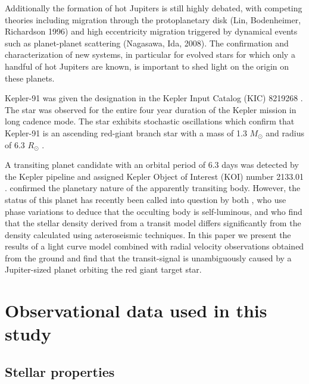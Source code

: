 \documentclass[apjl]{emulateapj}
\begin{document}
Additionally the formation of hot Jupiters is still highly debated, with competing theories including migration through the protoplanetary disk (Lin, Bodenheimer, Richardson 1996) and high eccentricity migration triggered by dynamical events such as planet-planet scattering (Nagasawa, Ida, 2008). The confirmation and characterization of new systems, in particular for evolved stars for which only a handful of hot Jupiters are known, is important to shed light on the origin on these planets.

Kepler-91 was given the designation in the Kepler Input Catalog (KIC) 8219268 \citep{brown11}. The star was observed for the entire four year duration of the Kepler mission in long cadence mode. The star exhibits stochastic oscillations which confirm that Kepler-91 is an ascending red-giant branch star with a mass of 1.3 $M_\odot$ and radius of 6.3 $R_\odot$ \citep{huber13,lillo14}.



A transiting planet candidate with an orbital period of 6.3 days was detected by the Kepler pipeline \citep{jenkins10} and assigned Kepler Object of Interest (KOI) number 2133.01 \citep{batalha12}. \citet{lillo14} confirmed the planetary nature of the apparently transiting body. However, the status of this planet has recently been called into question by both \citet{esteves13}, who use phase variations to deduce that the occulting body is self-luminous, and \citet{sliski14} who find that the stellar density derived from a transit model differs significantly from the density calculated using asteroseismic techniques. In this paper we present the results of a light curve model combined with radial velocity observations obtained from the ground and find that the transit-signal is unambiguously caused by a Jupiter-sized planet orbiting the red giant target star.


\section{Observational data used in this study}

\subsection{Stellar properties}
\end{document}
